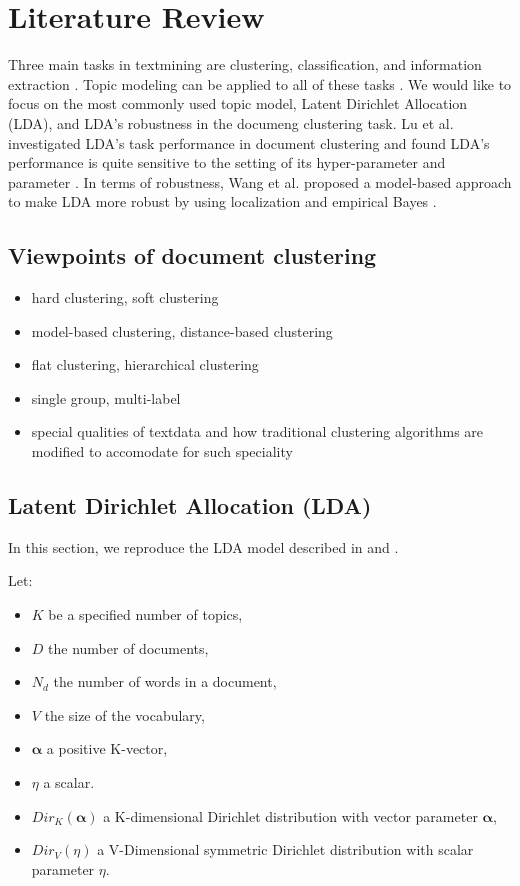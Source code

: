 \documentclass{article}
\begin{document}
\section{Literature Review}

Three main tasks in textmining are clustering, classification, and information extraction \cite{allahyari2017brief}. Topic modeling can be applied to all of these tasks \cite{lu2011investigating}. We would like to focus on the most commonly used topic model, Latent Dirichlet Allocation (LDA), and LDA's robustness in the documeng clustering task. Lu et al. investigated LDA's task performance in document clustering and found LDA's performance is quite sensitive to the setting of its hyper-parameter and parameter \cite{lu2011investigating}. In terms of robustness, Wang et al. proposed a model-based approach to make LDA more robust by using localization and empirical Bayes \cite{wang2018general}.


\subsection{Viewpoints of document clustering}

\begin{itemize}
  \item hard clustering, soft clustering
  \item model-based clustering, distance-based clustering
  \item flat clustering, hierarchical clustering
  \item single group, multi-label
  \item special qualities of textdata and how traditional clustering algorithms are modified to accomodate for such speciality
\end{itemize}



\subsection{Latent Dirichlet Allocation (LDA)}

In this section, we reproduce the LDA model described in \cite{wang2018general} and \cite{blei2009topic}.

Let:

\begin{itemize}
  \item $K$ be a specified number of topics,
  \item $D$ the number of documents,
  \item $N_d$ the number of words in a document,
  \item $V$  the size of the vocabulary,
  \item $\boldsymbol{\alpha}$ a positive K-vector,
  \item $\eta$ a scalar. 
  \item $Dir_K(\boldsymbol{\alpha})$ a K-dimensional Dirichlet distribution with vector parameter $\boldsymbol{\alpha}$,
  \item $Dir_V(\eta)$ a V-Dimensional symmetric Dirichlet distribution with scalar parameter $\eta$.
\end{itemize}
\end{document}

